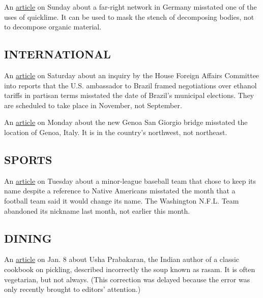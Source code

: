 An
\href{https://www.nytimes3xbfgragh.onion/2020/08/01/world/europe/germany-nazi-infiltration.html}{article}
on Sunday about a far-right network in Germany misstated one of the uses
of quicklime. It can be used to mask the stench of decomposing bodies,
not to decompose organic material.

\hypertarget{international}{%
\subsection{INTERNATIONAL}\label{international}}

An
\href{https://www.nytimes3xbfgragh.onion/2020/07/31/world/americas/brazil-trump-ethanol-chapman.html}{article}
on Saturday about an inquiry by the House Foreign Affairs Committee into
reports that the U.S. ambassador to Brazil framed negotiations over
ethanol tariffs in partisan terms misstated the date of Brazil's
municipal elections. They are scheduled to take place in November, not
September.

An
\href{https://www.nytimes3xbfgragh.onion/2020/08/02/world/europe/genoa-Morandi-bridge-replacement.html}{article}
on Monday about the new Genoa San Giorgio bridge misstated the location
of Genoa, Italy. It is in the country's northwest, not northeast.

\hypertarget{sports}{%
\subsection{SPORTS}\label{sports}}

An
\href{https://www.nytimes3xbfgragh.onion/2020/08/03/sports/baseball/indians-team-names-mascots.html}{article}
on Tuesday about a minor-league baseball team that chose to keep its
name despite a reference to Native Americans misstated the month that a
football team said it would change its name. The Washington N.F.L. Team
abandoned its nickname last month, not earlier this month.

\hypertarget{dining}{%
\subsection{DINING}\label{dining}}

An
\href{https://www.nytimes3xbfgragh.onion/2020/01/06/dining/indian-pickle-queen-usha-prabakaran.html}{article}
on Jan. 8 about Usha Prabakaran, the Indian author of a classic cookbook
on pickling, described incorrectly the soup known as rasam. It is often
vegetarian, but not always. (This correction was delayed because the
error was only recently brought to editors' attention.)


